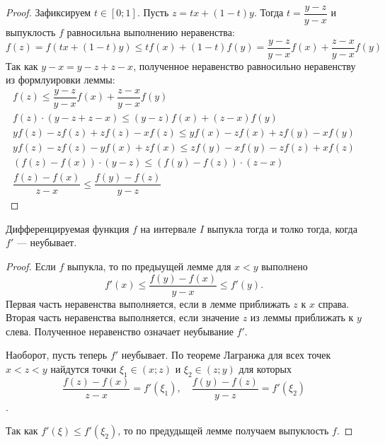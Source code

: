 \documentclass[a4paper]{article}
\theoremstyle{named}
\begin{document}
        \begin{proof}
            Зафиксируем $t \in [0; 1]$. Пусть $z = tx + (1 - t)y$. Тогда $t = \dfrac{y - z}{y - x}$ и выпуклость $f$ равносильна выполнению неравенства:
            \begin{equation*}
                f(z) = f(tx + (1 - t)y) \leq tf(x) + (1 - t)f(y) = \dfrac{y - z}{y - x}f(x) + \dfrac{z - x}{y - x}f(y)
            \end{equation*}
            Так как $y - x = y - z + z - x$, полученное неравенство равносильно неравенству из формлуировки леммы:
            \[\begin{gathered}
                f(z) \leq \dfrac{y - z}{y - x}f(x) + \dfrac{z - x}{y - x}f(y) \\
                f(z) \cdot (y - z + z - x) \leq (y - z)f(x) + (z - x) f(y) \\
                yf(z) - zf(z) + zf(z) - xf(z) \leq yf(x) - zf(x) + zf(y) - xf(y) \\
                yf(z) - zf(z) -yf(x) + zf(x) \leq zf(y) - xf(y) - zf(z) + xf(z) \\
                (f(z) - f(x)) \cdot (y - z) \leq (f(y) - f(z)) \cdot (z - x) \\
                \dfrac{f(z) - f(x)}{z - x} \leq \dfrac{f(y) - f(z)}{y - z}
            \end{gathered}\]
        \end{proof}

        \begin{theorem*}
            Дифференцируемая функция $f$ на интервале $I$ выпукла тогда и толко тогда, когда $f'$ --- неубывает.
        \end{theorem*}

        \begin{proof}
            Если $f$ выпукла, то по предыущей лемме для $x < y$ выполнено
            \begin{equation*}
                f'(x) \leq \dfrac{f(y) - f(x)}{y - x} \leq f'(y).
            \end{equation*}
            Первая часть неравенства выполняется, если в лемме приближать $z$ к $x$ справа. Вторая часть неравенства выполняется, если значение $z$ из леммы приближать к $y$ слева. Полученное неравенство означает неубывание $f'$.

            Наоборот, пусть теперь $f'$ неубывает. По теореме Лагранжа для всех точек $x < z < y$ найдутся точки $\xi_1 \in (x; z)$ и $\xi_2 \in (z; y)$ для которых
            \begin{equation*}
                \dfrac{f(z) - f(x)}{z - x} = f'(\xi_1), \quad
                \dfrac{f(y) - f(z)}{y - z} = f'(\xi_2)
            \end{equation*}.

            Так как $f'(\xi) \leq f'(\xi_2)$, то по предудыщей лемме получаем выпуклость $f$.
        \end{proof}
\end{document}

